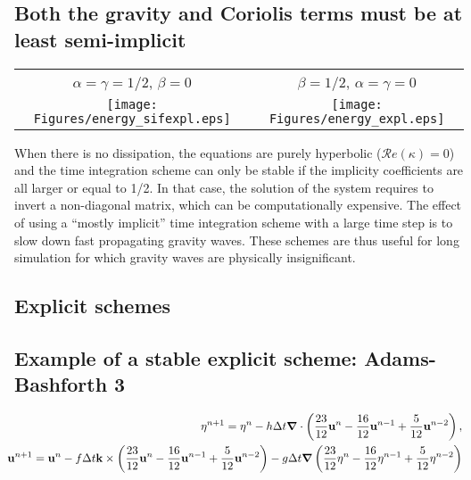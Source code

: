 \subsection{Both the gravity and Coriolis terms must be at least semi-implicit}

\begin{center}
	\begin{tabular}{cc}
		$\alpha = \gamma = 1/2$, $\beta=0$  & $\beta = 1/2$, $\alpha = \gamma = 0$ \\
		\texttt{[image: Figures/energy\_sifexpl.eps]}
		&
		\texttt{[image: Figures/energy\_expl.eps]}
	\end{tabular}
\end{center}

\BTi
When there is no dissipation, the equations are purely hyperbolic ($\mathcal{R}e(\kappa) = 0$) and the time integration scheme can only be stable if the implicity coefficients are all larger or equal to 1/2. In that case, the solution of the system requires to invert a non-diagonal matrix, which can be computationally expensive. The effect of using a ``mostly implicit'' time integration scheme with a large time step is to slow down fast propagating gravity waves. These schemes are thus useful for long simulation for which gravity waves are physically insignificant.
\ETi



\subsection{Explicit schemes}
\subsection{Example of a stable explicit scheme: Adams-Bashforth 3}

\begin{eqnarray*}
	&&\hspace{-0.6cm} \eta^{n+1} = \eta^n - h \Delta t \bnabla \cdot \left(\frac{23}{12} \bu^n - \frac{16}{12} \bu^{n-1} + \frac{5}{12} \bu^{n-2}\right),
	\\
	&&\hspace{-0.6cm} \bu^{n+1} = \bu^n - f \Delta t \bk \times \left(\frac{23}{12} \bu^n - \frac{16}{12} \bu^{n-1} + \frac{5}{12} \bu^{n-2}\right) - g \Delta t \bnabla \left( \frac{23}{12} \eta^n - \frac{16}{12} \eta^{n-1} + \frac{5}{12} \eta^{n-2} \right)
\end{eqnarray*}

